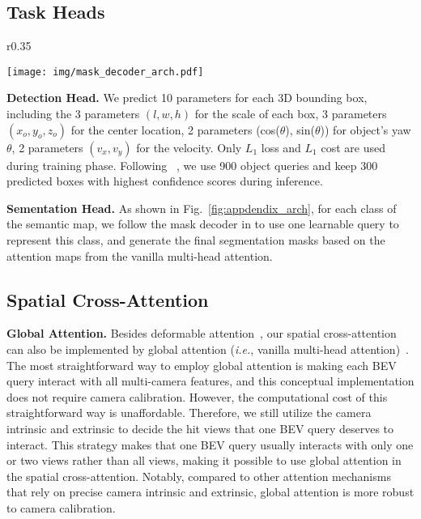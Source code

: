 \documentclass{article}
\def\ie{\emph{i.e.}}
\begin{document}
\subsection{Task Heads} 





\begin{wrapfigure}{r}{0.35\linewidth}
    \vspace{-35px}
\renewcommand{\captionlabelfont}{\scriptsize}
    \begin{center}
    \texttt{[image: img/mask\_decoder\_arch.pdf]}
    \caption{\scriptsize \textbf{
Segmentation head (mask decoder) of BEVFormer.
    }}
    \label{fig:appdendix_arch}
    \end{center}
    \vspace{-40px}
\end{wrapfigure}
\textbf{Detection Head.} We predict 
10 parameters for each 3D bounding box, 
including the 3 parameters  $(l,w,h)$ for the scale of each box, 3 parameters $(x_o,y_o,z_o)$ for the center location, 2 parameters  (cos($\theta$), sin($\theta$)) for object's yaw $\theta$, 2 parameters $(v_x,v_y)$ for the  velocity. Only $L_1$ loss and $L_1$ cost are used during training phase. Following ~\cite{wang2022detr3d}, we use 900 object queries and keep 300 predicted boxes with highest confidence scores during inference.

\noindent\textbf{Sementation Head.} 
As shown in Fig.~\ref{fig:appdendix_arch}, for each class of the semantic map, we follow the mask decoder in \cite{li2021panoptic} to use one learnable query to represent this class, and generate the final segmentation masks based on the attention maps from the vanilla multi-head attention.

\subsection{Spatial Cross-Attention}

\noindent\textbf{Global Attention.} Besides deformable attention~\cite{zhu2020deformable}, our spatial cross-attention can also be implemented by global attention (\ie,  vanilla multi-head attention)~\cite{vaswani2017attention}. The most straightforward way to employ global attention is making each BEV query interact with all multi-camera features, and this conceptual implementation does not require camera calibration.
However, the computational cost of this straightforward way is unaffordable. Therefore, we still utilize the camera intrinsic and extrinsic to decide the hit views that one BEV query deserves to interact. This strategy makes that one BEV query usually interacts with only one or two views rather than all views, making it possible to use global attention in the spatial cross-attention. Notably, compared to other attention mechanisms that rely on precise camera intrinsic and extrinsic, global attention is more robust to camera calibration.
\end{document}
